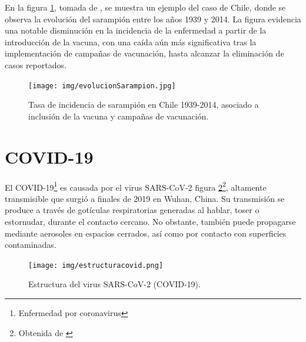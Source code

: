En la figura \ref{fig:evolución sarampión}, tomada de \cite{ahumada2015modelos}, se muestra un ejemplo del caso de Chile, donde se observa la evolución del sarampión entre los años 1939 y 2014. La figura evidencia una notable disminución en la incidencia de la enfermedad a partir de la introducción de la vacuna, con una caída aún más significativa tras la implementación de campañas de vacunación, hasta alcanzar la eliminación de casos reportados.

\begin{figure}[H]
        \centering
        \texttt{[image: img/evolucionSarampion.jpg]}
        \caption{Tasa de incidencia de sarampión en Chile 1939-2014, asociado a inclusión de la vacuna y campañas de vacunación.}
        \label{fig:evolución sarampión}
        \vspace{0.5cm} %
\end{figure}

\section{COVID-19}
El COVID-19\footnote{Enfermedad por coronavirus} es causada por el virus SARS-CoV-2 figura \ref{fig:covid estructura}\footnote{Obtenida de \cite{medlineplus_sarscov2}}, altamente transmisible que surgió a finales de 2019 en Wuhan, China. Su transmisión se produce a través de gotículas respiratorias generadas al hablar, toser o estornudar, durante el contacto cercano. No obstante, también puede propagarse mediante aerosoles en espacios cerrados, así como por contacto con superficies contaminadas.

\begin{figure}[H]
        \centering
        \texttt{[image: img/estructuracovid.png]}
        \caption{Estructura del virus SARS-CoV-2 (COVID-19).}
        \label{fig:covid estructura}
        \vspace{0.5cm} %
\end{figure}

